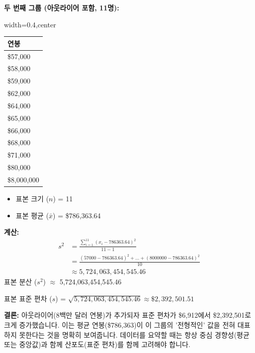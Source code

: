 \documentclass[11pt,a4paper]{article}
\theoremstyle{definition}
\begin{document}
\begin{examplebox}[title=예시: 연봉 데이터로 분산 및 표준 편차 계산]
\textbf{두 번째 그룹 (아웃라이어 포함, 11명):}
\begin{adjustbox}{width=0.4\textwidth,center}
\begin{tabular}{l}
\toprule
\textbf{연봉} \\
\midrule
\$57,000 \\
\$58,000 \\
\$59,000 \\
\$62,000 \\
\$64,000 \\
\$65,000 \\
\$66,000 \\
\$68,000 \\
\$71,000 \\
\$80,000 \\
\$8,000,000 \\
\bottomrule
\end{tabular}
\end{adjustbox}
\label{tab:salary_example2_sd}
\begin{itemize}
    \item 표본 크기 ($n$) = 11
    \item 표본 평균 ($\bar{x}$) = \$786,363.64
\end{itemize}
\textbf{계산:}
\begin{align*}
    s^2 &= \frac{\sum_{i=1}^{11} (x_i - 786363.64)^2}{11-1} \\
    &= \frac{(57000-786363.64)^2 + \dots + (8000000-786363.64)^2}{10} \\
    &\approx 5,724,063,454,545.46
\end{align*}
표본 분산 ($s^2$) $\approx$ 5,724,063,454,545.46

표본 표준 편차 ($s$) = $\sqrt{5,724,063,454,545.46} \approx \$2,392,501.51$

\textbf{결론:}
아웃라이어(8백만 달러 연봉)가 추가되자 표준 편차가 \$6,912에서 \$2,392,501로 크게 증가했습니다.
이는 평균 연봉(\$786,363)이 이 그룹의 '전형적인' 값을 전혀 대표하지 못한다는 것을 명확히 보여줍니다.
데이터를 요약할 때는 항상 중심 경향성(평균 또는 중앙값)과 함께 산포도(표준 편차)를 함께 고려해야 합니다.
\end{examplebox}
\end{document}
